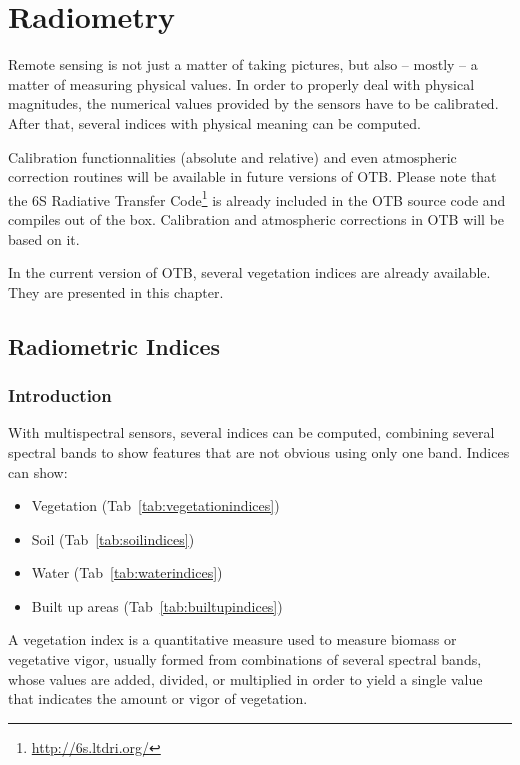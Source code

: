 \chapter{Radiometry}

Remote sensing is not just a matter of taking pictures, but also --
mostly -- a matter of measuring physical values. In order to properly
deal with physical magnitudes, the numerical values provided by the
sensors have to be calibrated. After that, several indices with
physical meaning can be computed.

Calibration functionnalities (absolute and relative) and even
atmospheric correction routines will be available in future versions
of OTB. Please note that the 6S Radiative Transfer Code\footnote{\url{http://6s.ltdri.org/}} 
is already included in the OTB source code and
compiles out of the box. Calibration and atmospheric corrections in
OTB will be based on it.

In the current version of OTB, several vegetation indices are already
available. They are presented in this chapter.


\section{Radiometric Indices}
\label{sec:VegetationIndex}
\label{sec:RadiometricIndex}

\subsection{Introduction}

With multispectral sensors, several indices can be computed, combining several
spectral bands to show features that are not obvious using only one band.
Indices can show:
\begin{itemize}
  \item Vegetation (Tab~\ref{tab:vegetationindices})
  \item Soil (Tab~\ref{tab:soilindices})
  \item Water (Tab~\ref{tab:waterindices})
  \item Built up areas (Tab~\ref{tab:builtupindices})
\end{itemize}

A vegetation index is a quantitative measure used to measure biomass
or vegetative vigor, usually formed from combinations of several
spectral bands, whose values are added, divided, or multiplied in
order to yield a single value that indicates the amount or vigor of
vegetation.

